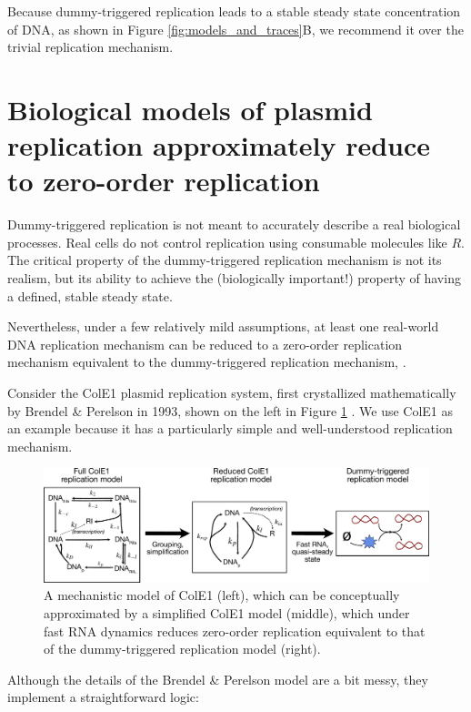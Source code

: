 \documentclass[journal = jacsat,manuscript = note]{achemso}
\begin{document}
Because dummy-triggered replication leads to a stable steady state concentration of DNA, as shown in Figure \ref{fig:models_and_traces}B, we recommend it over the trivial replication mechanism.

\section{Biological models of plasmid replication approximately reduce to zero-order replication}\label{sec:reduction}

Dummy-triggered replication is not meant to accurately describe a real biological processes. Real cells do not control replication using consumable molecules like $R$. The critical property of the dummy-triggered replication mechanism is not its realism, but its ability to achieve the (biologically important!) property of having a defined, stable steady state.

Nevertheless, under a few relatively mild assumptions, at least one real-world DNA replication mechanism can be reduced to a zero-order replication mechanism equivalent to the dummy-triggered replication mechanism, . 

Consider the ColE1 plasmid replication system, first crystallized mathematically by Brendel \& Perelson in 1993, shown on the left in Figure \ref{fig:bp_diagram} \cite{Brendel1993}. We use ColE1 as an example because it has a particularly simple and well-understood replication mechanism.

\begin{figure}[h]
\centering
\includegraphics[scale=.4]{figures/bp_diagram.pdf}
\caption{A mechanistic model of ColE1 (left), which can be conceptually approximated by a simplified ColE1 model (middle), which under fast RNA dynamics reduces zero-order replication equivalent to that of the dummy-triggered replication model (right).}
\label{fig:bp_diagram}
\end{figure}

Although the details of the Brendel \& Perelson model are a bit messy, they implement a straightforward logic:
\end{document}
